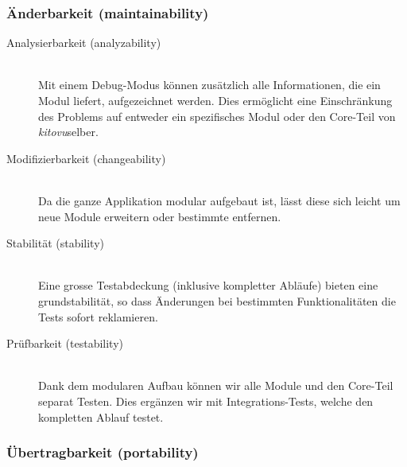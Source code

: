 \documentclass[a4paper]{article}
\begin{document}
\subsubsection{Änderbarkeit (maintainability)}

\begin{description}
  \item[Analysierbarkeit (analyzability)] \strut \\
    Mit einem Debug-Modus können zusätzlich alle Informationen, die ein Modul liefert, aufgezeichnet werden.
    Dies ermöglicht eine Einschränkung des Problems auf entweder ein spezifisches Modul oder den Core-Teil von \emph{kitovu}selber.
  \item[Modifizierbarkeit (changeability)] \strut \\
    Da die ganze Applikation modular aufgebaut ist, lässt diese sich leicht um neue Module erweitern oder bestimmte entfernen.
  \item[Stabilität (stability)] \strut \\
    Eine grosse Testabdeckung (inklusive kompletter Abläufe) bieten eine grundstabilität, so dass Änderungen bei bestimmten Funktionalitäten die Tests sofort reklamieren.
  \item[Prüfbarkeit (testability)] \strut \\
    Dank dem modularen Aufbau können wir alle Module und den Core-Teil separat Testen.
    Dies ergänzen wir mit Integrations-Tests, welche den kompletten Ablauf testet.
\end{description}

\subsubsection{Übertragbarkeit (portability)}
\end{document}
